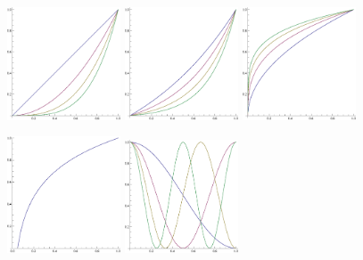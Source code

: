 \documentclass[useAMS,usenatbib]{mn2e}
\begin{document}
\begin{figure}
  \begin{center}
    \includegraphics[width=0.3\textwidth]{fig/Template1n.eps}
    \includegraphics[width=0.3\textwidth]{fig/Template2n.eps}
    \includegraphics[width=0.3\textwidth]{fig/Template3n.eps}
  \end{center}
  \begin{center}
    \includegraphics[width=0.3\textwidth]{fig/Template4n.eps}
    \includegraphics[width=0.3\textwidth]{fig/Template5n.eps}

\end{center}
\end{figure}
\end{document}
